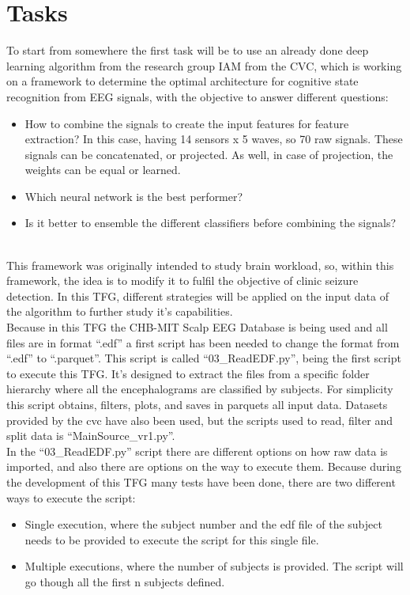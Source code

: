 ﻿\documentclass[10pt,a4paper,twocolumn,twoside]{article}
\begin{document}
\section{Tasks}
\label{sec-tasks}
To start from somewhere the first task will be to use an already done deep learning algorithm from the research group IAM from the CVC, which is working on a framework to determine the optimal architecture for cognitive state recognition from EEG signals, with the objective to answer different questions:
\begin{itemize}
  \item How to combine the signals to create the input features for feature extraction? In this case, having 14 sensors x 5 waves, so 70 raw signals. These signals can be concatenated, or projected. As well, in case of projection, the weights can be equal or learned.
  \item Which neural network is the best performer?
  \item Is it better to ensemble the different classifiers before combining the signals?
\end{itemize}
\leavevmode\\
This framework was originally intended to study brain workload, so, within this framework, the idea is to modify it to fulfil the objective of clinic seizure detection. In this TFG, different strategies will be applied on the input data of the algorithm to further study it’s capabilities.
\\
Because in this TFG the CHB-MIT Scalp EEG Database is being used and all files are in format “.edf” a first script has been needed to change the format from “.edf” to “.parquet”. This script is called “03\_ReadEDF.py”, being the first script to execute this TFG. It’s designed to extract the files from a specific folder hierarchy where all the encephalograms are classified by subjects. For simplicity this script obtains, filters, plots, and saves in parquets all input data. Datasets provided by the cvc have also been used, but the scripts used to read, filter and split data is “MainSource\_vr1.py”.
\\
In the “03\_ReadEDF.py” script there are different options on how raw data is imported, and also there are options on the way to execute them. Because during the development of this TFG many tests have been done, there are two different ways to execute the script:
\\
\begin{itemize}
  \item Single execution, where the subject number and the edf file of the subject needs to be provided to execute the script for this single file. 
  \item Multiple executions, where the number of subjects is provided. The script will go though all the first n subjects defined.
\end{itemize}
\end{document}
